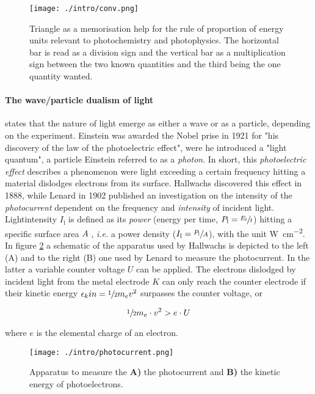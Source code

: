 	\begin{figure}[h]%
		\centering
		\label{fig:conv}
		\texttt{[image: ./intro/conv.png]}
		\caption{Triangle as a memorisation help for the rule of proportion of energy units relevant to photochemistry and photophysics. The horizontal bar is read as a division sign and the vertical bar as a multiplication sign between the two known quantities and the third being the one quantity wanted.}
	\end{figure}

	\paragraph{The wave/particle dualism of light} states that the nature of light emerge as either a wave or as a particle, depending on the experiment. Einstein was awarded the Nobel prise in 1921 for "his discovery of the law of the photoelectric effect", were he introduced a "light quantum", a particle Einstein referred to as a \emph{photon}. In short, this \emph{photoelectric effect} describes a phenomenon were light exceeding a certain frequency hitting a material dislodges electrons from its surface. Hallwachs discovered this effect in 1888, while Lenard in 1902 published an investigation on the intensity of the \emph{photocurrent} dependent on the frequency and \emph{intensity} of incident light. Lightintensity $I_\mathrm{l}$ is defined as its \emph{power} (energy per time, $P_\mathrm{l} = \sfrac{E_\mathrm{l}}{t}$) hitting a specific surface area $A$ , \textit{i.e.} a power density ($I_\mathrm{l} = \sfrac{P_\mathrm{l}}{A}$), with the unit \unit{\W\per\square\cm}. In figure \ref{fig:photocurrent} a schematic of the apparatus used by Hallwachs is depicted to the left (A) and to the right (B) one used by Lenard to measure the photocurrent. In the latter a variable counter voltage $U$ can be applied. The electrons dislodged by incident light from the metal electrode $K$ can only reach the counter electrode if their kinetic energy $\epsilon_kin = \sfrac{1}{2} m_ev^2$ surpasses the counter voltage, or

	\begin{equation}[h]%
		\sfrac{1}{2}m_e\cdot v^2 > e\cdot U
	\end{equation}

	where $e$ is the elemental charge of an electron. 

	\begin{figure}[h]%
		\centering
		\label{fig:photocurrent}
		\texttt{[image: ./intro/photocurrent.png]}
		\caption{Apparatus to measure the \textbf{A)} the photocurrent and \textbf{B)} the kinetic energy of photoelectrons.}
	\end{figure}

